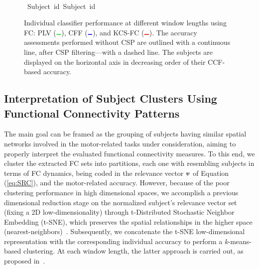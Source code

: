 \begin{figure}[h!]
	{} \\
	\hbox{\hspace{3.3cm} \footnotesize{Subject id}\hspace{5.1cm} \footnotesize{Subject id}}
	\caption{Individual classifier performance at different window lengths using FC: PLV (${\lineplot{color5}}$), CFF (${\lineplot{color1}}$), and KCS-FC (${\lineplot{color3}}$). The accuracy assessments performed without CSP are outlined with a continuous line, after CSP filtering---with a dashed line. The subjects are displayed on the horizontal axis in decreasing order of their CCF-based accuracy.}
	\label{Fig:IndividualAcc}
\end{figure}

\subsection{Interpretation of Subject Clusters Using Functional Connectivity Patterns}

The main goal can be framed as the grouping of subjects having similar spatial networks involved in the motor-related tasks under consideration, aiming to properly interpret the evaluated functional connectivity measures. {To this end, we cluster the extracted FC sets into partitions, each one with resembling subjects in terms of FC dynamics, being coded in the relevance vector $\bm {v}$ of Equation (\ref{eq:SRC}), and the motor-related accuracy. However, because of the poor clustering performance in high dimensional spaces, we accomplish a previous dimensional reduction stage on the normalized subject's relevance vector set (fixing a 2D low-dimensionality) through t-Distributed Stochastic Neighbor Embedding (t-SNE), which preserves the spatial relationships in the higher space (nearest-neighbors)~\cite{linderman2019clustering}. Subsequently, we concatenate the t-SNE low-dimensional representation with the corresponding individual accuracy to perform a \textit{k}-means-based clustering. At each window length, the latter approach is carried out, as proposed in~\cite{Kim2019}.}

